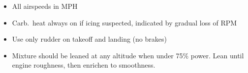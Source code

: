 \documentclass{article}
\begin{document}
\begin{multicols*}{3}

    \begin{clitemize}
    \end{clitemize}


    \begin{clitemize}
    \end{clitemize}


    \begin{clitemize}
    \end{clitemize}

    \columnbreak

    \noteheading

    \begin{itemize}[leftmargin=*]
      \item All airspeeds in MPH
      \item Carb.\ heat always on if icing suspected, indicated by gradual loss of RPM
      \item Use only rudder on takeoff and landing (no brakes)
      \item Mixture should be leaned at any altitude when under 75\% power. Lean until engine roughness, then enrichen to smoothness.
    \end{itemize}

    \begin{clitemize}
    \end{clitemize}

  \end{multicols*}
\end{document}
